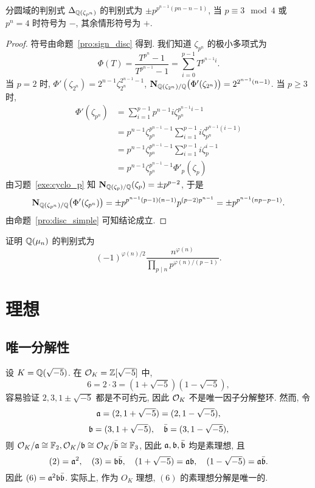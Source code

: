 \begin{proposition}{分圆域的判别式}{}
$\Delta_{{\mathbb{Q}}(\zeta_{p^n})}$ 的判别式为 $\pm p^{p^{n-1}(pn-n-1)}$, 当 $p\equiv 3\mod 4$ 或 $p^n=4$ 时符号为 $-$, 其余情形符号为 $+$.
\end{proposition}
\begin{proof}
符号由命题~\ref{pro:sign_disc} 得到. 我们知道 $\zeta_{p^n}$ 的极小多项式为
	\[\Phi(T)=\frac{T^{p^n}-1}{T^{p^{n-1}}-1}=\sum_{i=0}^{p-1} T^{p^{n-1}i}.\]
当 $p=2$ 时, $\Phi'(\zeta_{2^n})=2^{n-1}\zeta_{2^n}^{2^{n-1}-1}$, ${\mathbf{N}}_{{\mathbb{Q}}(\zeta_{2^n})/{\mathbb{Q}}}\bigl(\Phi'(\zeta_{2^n})\bigr)=2^{2^{n-1}(n-1)}$. 当 $p\ge 3$ 时, 
	\[\begin{split}
		\Phi'(\zeta_{p^n})&=\sum_{i=1}^{p-1}p^{n-1}i\zeta_{p^n}^{p^{n-1}i-1}\\
		 &=p^{n-1}\zeta_{p^n}^{p^{n-1}-1}\sum_{i=1}^{p-1}i\zeta_{p^n}^{p^{n-1}(i-1)}\\
		 &=p^{n-1}\zeta_{p^n}^{p^{n-1}-1}\sum_{i=1}^{p-1}i\zeta_{p}^{i-1}\\
		 &=p^{n-1}\zeta_{p^n}^{p^{n-1}-1}\Phi'_p(\zeta_p)
	\end{split}\]
由习题~\ref{exe:cyclo_p} 知 ${\mathbf{N}}_{{\mathbb{Q}}(\zeta_p)/{\mathbb{Q}}}(\zeta_p)=\pm p^{p-2}$, 于是
	\[{\mathbf{N}}_{{\mathbb{Q}}(\zeta_{p^n})/{\mathbb{Q}}}\bigl(\Phi'(\zeta_{p^n})\bigr)=\pm p^{p^{n-1}(p-1)(n-1)} p^{(p-2)p^{n-1}}=\pm p^{p^{n-1}(np-p-1)}.\]
由命题~\ref{pro:disc_simple} 可知结论成立.
\end{proof}

\begin{exercise}
证明 ${\mathbb{Q}}(\mu_n)$ 的判别式为
	\[(-1)^{\varphi(n)/2}\frac{n^{\varphi(n)}}{\prod_{p\mid n}p^{\varphi(n)/(p-1)}}.\]
\end{exercise}



\section{理想}

\subsection{唯一分解性}
\begin{example}
设 $K={\mathbb{Q}}(\sqrt{-5})$. 在 ${\mathcal{O}}_K={\mathbb{Z}}[\sqrt{-5}]$ 中,
	\[6=2\cdot 3=(1+\sqrt{-5})(1-\sqrt{-5}),\]
容易验证 $2,3,1\pm\sqrt{-5}$ 都是不可约元, 因此 ${\mathcal{O}}_K$ 不是唯一因子分解整环. 然而, 令 
	\[{\mathfrak{a}}=(2,1+\sqrt{-5})=(2,1-\sqrt{-5}), \]
	\[{\mathfrak{b}}=(3,1+\sqrt{-5}),\quad \bar {{\mathfrak{b}}}=(3,1-\sqrt{-5}),\]
则 ${\mathcal{O}}_K/{\mathfrak{a}}\cong {\mathbb{F}}_2,{\mathcal{O}}_K/{\mathfrak{b}}\cong {\mathcal{O}}_K/\bar {{\mathfrak{b}}}\cong {\mathbb{F}}_3$, 因此 ${\mathfrak{a}},{\mathfrak{b}},\bar {{\mathfrak{b}}}$ 均是素理想, 且
	\[(2)={\mathfrak{a}}^2,\quad (3)={\mathfrak{b}}\bar {{\mathfrak{b}}},\quad (1+\sqrt{-5})={\mathfrak{a}}{\mathfrak{b}},\quad (1-\sqrt{-5})={\mathfrak{a}}\bar{{\mathfrak{b}}}.\]
因此 $(6)={\mathfrak{a}}^2 {\mathfrak{b}}\bar{{\mathfrak{b}}}$. 实际上, 作为 $O_K$ 理想, $(6)$ 的素理想分解是唯一的.
\end{example}

